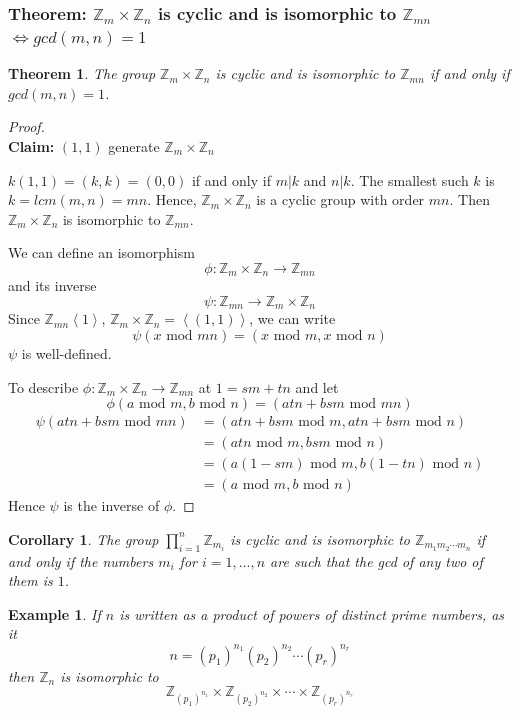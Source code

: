 \documentclass[11pt,a4paper]{article}
\newtheorem{theorem}{Theorem}
\newtheorem{example}{Example}
\newtheorem{corollary}{Corollary}
\begin{document}
\subsubsection{Theorem: $\mathbb{Z}_m\times \mathbb{Z}_n$ is cyclic and is isomorphic to $\mathbb{Z}_{mn}$ $\Leftrightarrow gcd(m,n)=1$}
\begin{theorem}
The group $\mathbb{Z}_m\times \mathbb{Z}_n$ is cyclic and is isomorphic to $\mathbb{Z}_{mn}$ if and only if $gcd(m,n)=1$.
\end{theorem}
\begin{proof}
\quad\\
\textbf{Claim:} $(1,1)$ generate $\mathbb{Z}_m\times \mathbb{Z}_n$

$k(1,1)=(k,k)=(0,0)$ if and only if $m|k$ and $n|k$. The smallest such $k$ is $k=lcm(m,n)=mn$. Hence, $\mathbb{Z}_m\times \mathbb{Z}_n$ is a cyclic group with order $mn$. Then $\mathbb{Z}_m\times \mathbb{Z}_n$ is isomorphic to $\mathbb{Z}_{mn}$.

We can define an isomorphism $$\phi:\mathbb{Z}_m\times \mathbb{Z}_n \rightarrow \mathbb{Z}_{mn}$$ and its inverse $$\psi: \mathbb{Z}_{mn} \rightarrow \mathbb{Z}_m\times \mathbb{Z}_n$$
Since $\mathbb{Z}_{mn}\left\langle 1\right\rangle$, $\mathbb{Z}_m\times \mathbb{Z}_n=\left\langle (1,1)\right\rangle$, we can write $$\psi(x\text{ mod }mn)=(x\text{ mod }m,x\text{ mod }n)$$
$\psi$ is well-defined.

To describe $\phi:\mathbb{Z}_m\times \mathbb{Z}_n \rightarrow \mathbb{Z}_{mn}$ at $1=sm+tn$ and let $$\phi(a\text{ mod }m,b\text{ mod }n)=(atn+bsm\text{ mod }mn)$$
\begin{equation}
    \begin{aligned}
        \psi(atn+bsm\text{ mod }mn)&=(atn+bsm\text{ mod }m,atn+bsm\text{ mod }n)\\
        &=(atn\text{ mod }m,bsm\text{ mod }n)\\
        &=(a(1-sm)\text{ mod }m,b(1-tn)\text{ mod }n)\\
        &=(a\text{ mod }m,b\text{ mod }n)
    \end{aligned}
    \nonumber
\end{equation}
Hence $\psi$ is the inverse of $\phi$.
\end{proof}



\begin{corollary}
    The group $\prod_{i=1}^n \mathbb{Z}_{m_i}$ is cyclic and is isomorphic to $\mathbb{Z}_{m_1m_2\cdots m_n}$ if and only if the numbers $m_i$ for $i=1,...,n$ are such that the gcd of any two of them is $1$.
\end{corollary}
\begin{example}
If $n$ is written as a product of powers of distinct prime numbers, as it $$n=(p_1)^{n_1}(p_2)^{n_2}\cdots(p_r)^{n_r}$$
then $\mathbb{Z}_n$ is isomorphic to $$\mathbb{Z}_{(p_1)^{n_1}}\times \mathbb{Z}_{(p_2)^{n_2}}\times \cdots\times \mathbb{Z}_{(p_r)^{n_r}}$$
\end{example}
\end{document}
